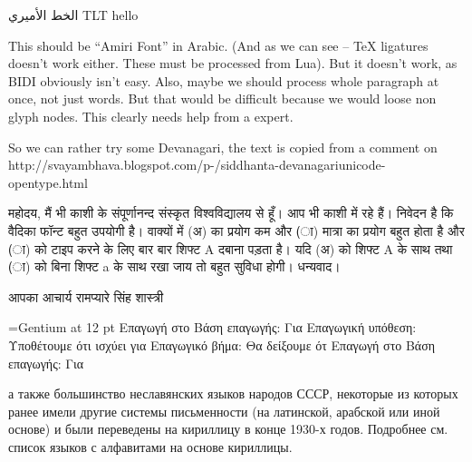 \documentclass{article}
\begin{document}
 الخط الأميري {\luatextextdir TLT hello}

\egroup

\ahoj
{}

This should be ``Amiri Font'' in Arabic. (And as we can see -- TeX ligatures
doesn't work either. These must be processed from Lua). But it doesn't work, as
BIDI obviously isn't easy. Also, maybe we should process whole paragraph at
once, not just words. But that would be difficult because we would loose non
glyph nodes. This clearly needs help from a expert.

\siddhanta
So we can rather try some Devanagari, the text is copied from a comment on http://svayambhava.\-blogspot.com\-/p\--/\-sidd\-hanta-\-deva\-na\-ga\-ri\-unicode-\-open\-type.html


महोदय,
मैं भी काशी के संपूर्णानन्द संस्कृत विश्वविद्यालय से हूँ। आप भी काशी में रहे हैं।
निवेदन है कि वैदिका फॉन्ट बहुत उपयोगी है। वाक्यों में (अ) का प्रयोग कम और (ा) मात्रा का प्रयोग बहुत होता है और (ा) को टाइप करने के लिए बार बार शिफ्ट A दबाना पड़ता है। यदि (अ) को शिफ्ट A के साथ तथा (ा) को बिना शिफ्ट a के साथ रखा जाय तो बहुत सुविधा होगी।
धन्यवाद।

आपका
आचार्य रामप्यारे सिंह शास्त्री

\font\gentium={Gentium} at 12 pt
\gentium
Επαγωγή στο 
Βάση επαγωγής: Για 
Επαγωγική υπόθεση: Υποθέτουμε ότι ισχύει για 
Επαγωγικό βήμα: Θα δείξουμε ότ
Επαγωγή στο
Βάση επαγωγής: Για 

\gentium

а также большинство неславянских языков народов СССР, некоторые из которых
ранее имели другие системы письменности (на латинской, арабской или иной
основе) и были переведены на кириллицу в конце 1930-х годов. Подробнее см.
список языков с алфавитами на основе кириллицы.  
\end{document}
